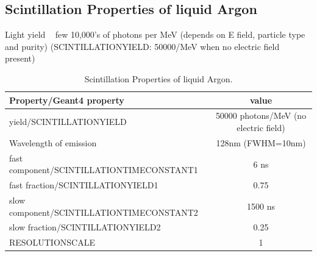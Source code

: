 \documentclass[a4paper]{jpconf}
\begin{document}
  \subsection{Scintillation Properties of liquid Argon}
  Light yield ~ few 10,000’s of photons per MeV (depends on E field, particle type and purity)
(SCINTILLATIONYIELD: 50000/MeV when no electric field present)
  \begin{table}[h!]
  \begin{center}
    \label{tab:table1}
    \begin{tabular}{|l|c|} %
      \hline
      \textbf{Property/Geant4 property} &       \textbf{value}\\
      \hline
      yield/SCINTILLATIONYIELD & 50000 photons/MeV (no electric field)\\
      Wavelength of emission &  128nm (FWHM=10nm)\\
      fast component/SCINTILLATIONTIMECONSTANT1& 6 ns\\  
      fast fraction/SCINTILLATIONYIELD1& 0.75 \\
      slow component/SCINTILLATIONTIMECONSTANT2& 1500 ns \\
      slow fraction/SCINTILLATIONYIELD2& 0.25\\
      RESOLUTIONSCALE& 1\\
      \hline
    \end{tabular}
  \end{center}
  \caption{Scintillation Properties of liquid Argon.}
  \end{table}
\end{document}

